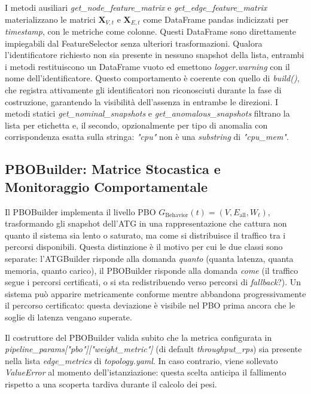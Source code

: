 I metodi ausiliari \textit{get\_node\_feature\_matrix} e \textit{get\_edge\_feature\_matrix}
materializzano le matrici $\mathbf{X}_{V,t}$ e $\mathbf{X}_{E,t}$ come DataFrame pandas
indicizzati per \textit{timestamp}, con le metriche come colonne. Questi DataFrame sono
direttamente impiegabili dal FeatureSelector senza ulteriori trasformazioni. Qualora
l'identificatore richiesto non sia presente in nessuno snapshot della lista, entrambi i
metodi restituiscono un DataFrame vuoto ed emettono \textit{logger.warning} con il nome
dell'identificatore. Questo comportamento è coerente con quello di \textit{build()}, che registra attivamente gli
identificatori non riconosciuti durante la fase di costruzione, garantendo la visibilità
dell'assenza in entrambe le direzioni. I metodi statici
\textit{get\_nominal\_snapshots} e \textit{get\_anomalous\_snapshots} filtrano la lista per
etichetta e, il secondo, opzionalmente per tipo di anomalia con corrispondenza esatta sulla
stringa: \textit{"cpu"} non è una \textit{substring} di \textit{"cpu\_mem"}.

\subsection{PBOBuilder: Matrice Stocastica e Monitoraggio Comportamentale}
\label{subsec:impl_pbo}

Il PBOBuilder implementa il livello \gls{PBO} $G_{\text{Behavior}}(t) = (V, E_{\text{all}}, W_t)$,
trasformando gli snapshot dell'ATG in una rappresentazione che cattura non quanto il sistema sia
lento o saturato, ma come si distribuisce il traffico tra i percorsi disponibili. Questa
distinzione è il motivo per cui le due classi sono separate: l'ATGBuilder risponde alla domanda
\textit{quanto} (quanta latenza, quanta memoria, quanto carico), il PBOBuilder risponde alla
domanda \textit{come} (il traffico segue i percorsi certificati, o si sta redistribuendo verso
percorsi di \textit{fallback}?). Un sistema può apparire metricamente conforme mentre abbandona
progressivamente il percorso certificato: questa deviazione è visibile nel PBO prima ancora che
le soglie di latenza vengano superate.

Il costruttore del PBOBuilder valida subito che la metrica configurata in
\textit{pipeline\_params["pbo"]["weight\_metric"]} (di default \textit{throughput\_rps}) sia
presente nella lista \textit{edge\_metrics} di \textit{topology.yaml}. In caso contrario,
viene sollevato \textit{ValueError} al momento dell'istanziazione: questa scelta anticipa il
fallimento rispetto a una scoperta tardiva durante il calcolo dei pesi.

